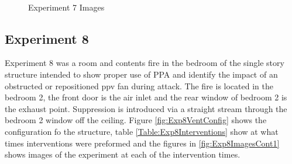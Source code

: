 \documentclass{article}
\begin{document}
\begin{figure}[H]
	\ContinuedFloat 
	\centering 
	 \ 
	 \ 
	 \ 
	\caption{Experiment 7 Images}
	\label{fig:Experiment7ImagesCont3} 
\end{figure}

\subsection{Experiment 8}
Experiment 8 was a room and contents fire in the bedroom of the single story structure intended to show proper use of PPA and identify the impact of an obstructed or repositioned ppv fan during attack. The fire is located in the bedroom 2, the front door is the air inlet and the rear window of bedroom 2 is the exhaust point. Suppression is introduced via a straight stream through the bedroom 2 window off the ceiling. Figure \ref{fig:Exp8VentConfig} shows the configuration fo the structure, table \ref{Table:Exp8Interventions} show at what times interventions were preformed and the figures in \ref{fig:Exp8ImagesCont1} shows images of the experiment at each of the intervention times.
\end{document}

